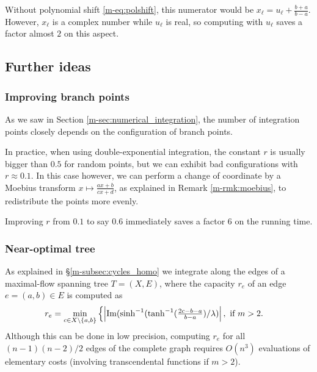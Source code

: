 \documentclass[main.tex]{subfiles}
\begin{document}
   Without polynomial shift \eqref{m-eq:polshift}, this numerator would be
   $x_\ell=u_\ell+\frac{b+a}{b-a}$. However, $x_\ell$ is a complex number while $u_\ell$
   is real, so computing with $u_\ell$ saves a factor almost $2$ on this aspect.

   \subsection{Further ideas}

   \subsubsection{Improving branch points}
   \label{subsec:improving}

   As we saw in Section \ref{m-sec:numerical_integration}, the number of integration points
   closely depends on the configuration of branch points.

   In practice, when using double-exponential integration, the constant $r$ is usually bigger than $0.5$
   for random points, but we can exhibit bad configurations with $r\approx 0.1$.
   In this case however, we can perform a change of coordinate by a Moebius transform
   $x\mapsto \frac{ax+b}{cx+d}$, as explained in Remark \ref{m-rmk:moebius}, to redistribute the points more evenly.

   Improving $r$ from $0.1$ to say $0.6$ immediately saves a factor $6$ on the running time.

   \subsubsection{Near-optimal tree}
    As explained in \S \ref{m-subsec:cycles_homo} we integrate along the edges of a maximal-flow spanning tree $T = (X,E)$, where the capacity $r_e$ of an edge $e = (a,b) \in E$ is computed as
    \begin{equation*}
     r_e =  \min_{c \in X \setminus \{ a,b\}} \begin{cases}
         \left| \operatorname{Im}(\sinh^{-1}(\tanh^{-1}(\frac{2c - b -a}{b-a})/\lambda) \right|, \text{ if $m>2$.}
            \end{cases}
    \end{equation*}
    Although this can be done in low precision, computing $r_e$ for all $(n-1)(n-2)/2$ edges of the complete graph
    requires $O(n^3)$ evaluations of elementary costs (involving transcendental functions if $m>2$).
\end{document}
